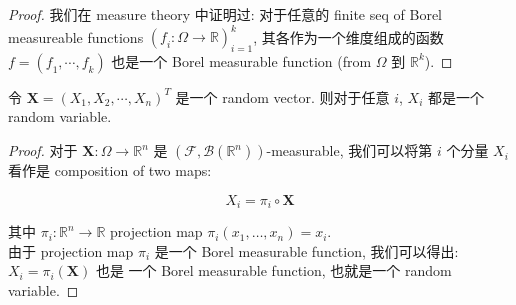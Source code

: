 \begin{proof}

我们在 measure theory 中证明过: 对于任意的 finite seq of Borel measureable functions \((\mathit{f}_{\mathit{i}}:\Omega\rightarrow\mathbb{R})_{\mathit{i} = 1}^{\mathit{k}}\), 其各作为一个维度组成的函数 \(\mathit{f} = (\mathit{f}_{1},\cdots,\mathit{f}_{\mathit{k}})\) 也是一个 Borel measurable function (from \(\Omega\) 到 \(\mathbb{R}^{\mathit{k}}\)).

\end{proof}

\begin{proposition}{}

令 \(\mathbf{X} = (\mathit{X}_{1},\mathit{X}_{2},\cdots,\mathit{X}_{\mathit{n}})^{\mathit{T}}\) 是一个 random vector. 则对于任意 \(\mathit{i}\), \(\mathit{X}_{\mathit{i}}\) 都是一个 random variable.

\end{proposition}

\begin{proof}

对于 \(\mathbf{X}:\Omega\rightarrow\mathbb{R}^{\mathit{n}}\) 是 \((\mathcal{F},\mathcal{B}(\mathbb{R}^{\mathit{n}}))\)-measurable, 我们可以将第 \(\mathit{i}\) 个分量 \(\mathit{X}_{\mathit{i}}\) 看作是 composition of two maps:

\[\mathit{X}_{\mathit{i}} = \mathit{\pi}_{\mathit{i}} \circ \mathbf{X}\]

其中 \(\mathit{\pi}_{\mathit{i}}:\mathbb{R}^{\mathit{n}}\rightarrow\mathbb{R}\) projection map \(\mathit{\pi}_{\mathit{i}}(\mathit{x}_{1},\ldots,\mathit{x}_{\mathit{n}}) = \mathit{x}_{\mathit{i}}\).\\
由于 projection map \(\mathit{\pi}_{\mathit{i}}\) 是一个 Borel measurable function, 我们可以得出: \(\mathit{X}_{\mathit{i}} = \mathit{\pi}_{\mathit{i}}(\mathbf{X})\) 也是 一个 Borel measurable function, 也就是一个 random variable.

\end{proof}

